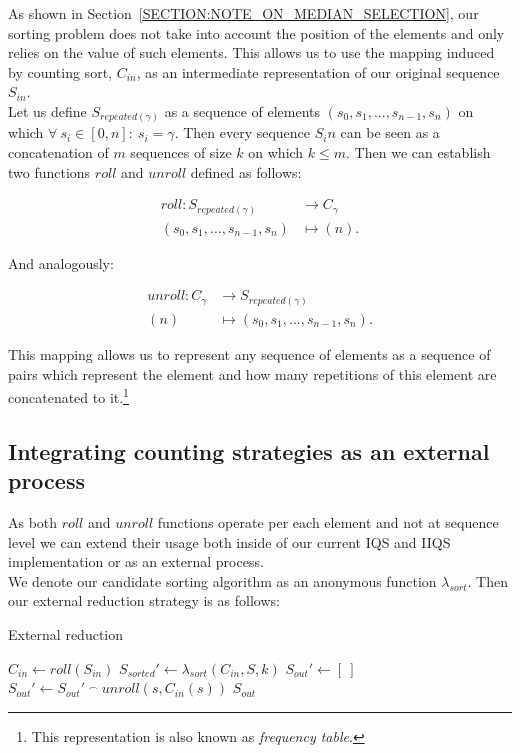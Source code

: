 As shown in Section~\ref{SECTION:NOTE_ON_MEDIAN_SELECTION}, our sorting problem does not take into account the position of the elements and only relies on the value of such elements. This allows us to use the mapping induced by counting sort, $C_{in}$, as an intermediate representation of our original sequence $S_{in}$.\\

Let us define $S_{repeated(\gamma)}$ as a sequence of elements $(s_0, s_1,...,s_{n-1},s_{n})$ on which $\forall ~s_i \in [0,n]:~s_i = \gamma$. Then every sequence $S_in$ can be seen as a concatenation of $m$ sequences of size $k$ on which $k \leq m$. Then we can establish two functions $roll$ and $unroll$ defined as follows:

\begin{align*}
    roll \colon S_{repeated(\gamma)} &\to C_{\gamma}\\
    (s_0, s_1,...,s_{n-1},s_{n})  &\mapsto (n).
\end{align*}

And analogously:

\begin{align*}
    unroll \colon C_{\gamma} &\to S_{repeated(\gamma)}\\
    (n) &\mapsto (s_0, s_1,...,s_{n-1},s_{n}).
\end{align*}

This mapping allows us to represent any sequence of elements as a sequence of pairs which represent the element and how many repetitions of this element are concatenated to it.\footnote{This representation is also known as \emph{frequency table}.}\\

\subsection{Integrating counting strategies as an external process}
As both $roll$ and $unroll$ functions operate per each element and not at sequence level we can extend their usage both inside of our current IQS and IIQS implementation or as an external process.\\

We denote our candidate sorting algorithm as an anonymous function $\lambda_{sort}$. Then our external reduction strategy is as follows:


\begin{algorithm}
\caption{External reduction}\label{ALG:EXTERNAL_IQS}
\begin{algorithmic}[1]
    \State $C_{in} \gets roll(S_{in})$
    \State $S_{sorted}' \gets \lambda_{sort}(C_{in}, S, k)$
    \State $S_{out}' \gets [~]$
        \State $S_{out}' \gets S_{out}'~^\frown~unroll(s, C_{in}(s))$
    \EndFor
    \State \Return $S_{out}$
    \EndProcedure
\end{algorithmic}
\end{algorithm}

